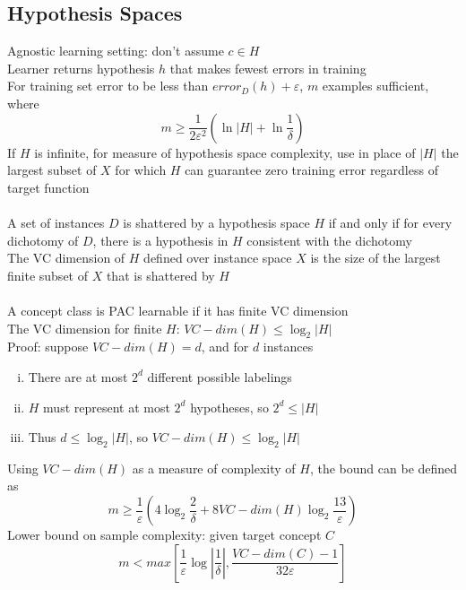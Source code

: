 \documentclass{article}
\begin{document}
		\subsection{Hypothesis Spaces}
			Agnostic learning setting: don't assume $c \in H$ \\
			Learner returns hypothesis $h$ that makes fewest errors in training \\
			For training set error to be less than $error_D(h) + \varepsilon$, $m$ examples sufficient, where
			\begin{equation*}
				m \geq \frac{1}{2\varepsilon^2}\left(\ln{|H|} + \ln{\frac{1}{\delta}}\right)
				\end{equation*}
			If $H$ is infinite, for measure of hypothesis space complexity, use in place of $|H|$ the largest subset of $X$ for which $H$ can guarantee zero training error regardless of target function \\
			\\
			A set of instances $D$ is shattered by a hypothesis space $H$ if and only if for every dichotomy of $D$, there is a hypothesis in $H$ consistent with the dichotomy \\
			The VC dimension of $H$ defined over instance space $X$ is the size of the largest finite subset of $X$ that is shattered by $H$ \\
			\\
			A concept class is PAC learnable if it has finite VC dimension \\
			The VC dimension for finite $H$: $VC-dim(H) \leq \log_2|H|$ \\
			Proof: suppose $VC-dim(H) = d$, and for $d$ instances
			\begin{enumerate}[(i)]
				\item There are at most $2^d$ different possible labelings
				\item $H$ must represent at most $2^d$ hypotheses, so $2^d \leq |H|$
				\item Thus $d \leq \log_2|H|$, so $VC-dim(H) \leq \log_2|H|$
				\end{enumerate} 
			Using $VC-dim(H)$ as a measure of complexity of $H$, the bound can be defined as
			\begin{equation*}
				m \geq \frac{1}{\varepsilon}\left(4\log_2\frac{2}{\delta} + 8VC-dim(H)\log_2\frac{13}{\varepsilon}\right)
				\end{equation*}
			Lower bound on sample complexity: given target concept $C$
			\begin{equation*}
				m < max\left[\frac{1}{\varepsilon}\log{|\frac{1}{\delta}|}, \frac{VC-dim(C) - 1}{32\varepsilon}\right]
				\end{equation*}
\end{document}
